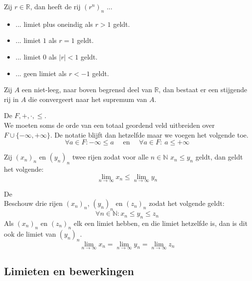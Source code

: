 \documentclass[main.tex]{subfiles}
\begin{document}
\begin{pr}
  Zij $r\in \mathbb{R}$, dan heeft de rij $(r^{n})_{n}$ ...
  \begin{itemize}
  \item ... limiet plus oneindig als $r>1$ geldt.
  \item ... limiet $1$ als $r=1$ geldt.
  \item ... limiet $0$ als $|r|<1$ geldt.
  \item ... geen limiet als $r<-1$ geldt.
  \end{itemize}
\end{pr}

\begin{pr}
  Zij $A$ een niet-leeg, naar boven begrensd deel van $\mathbb{R}$, dan bestaat er een stijgende rij in $A$ die convergeert naar het supremum van $A$.
  
\end{pr}

\begin{de}
  De  $F,+,\cdot,\le$.\\
  We moeten soms de orde van een totaal geordend veld uitbreiden over $F \cup \{ -\infty,+\infty\}$.
  De notatie blijft dan hetzelfde maar we voegen het volgende toe.
  \[ \forall a\in F: -\infty \le a \quad\text{ en }\quad \forall a \in F:\ a \le +\infty \]
\end{de}

\begin{pr}
  Zij $(x_{n})_{n}$ en $(y_{n})_{n}$ twee rijen zodat voor alle $n\in \mathbb{N}$ $x_{n}\le y_{n}$ geldt, dan geldt het volgende:
  \[ \lim_{n\rightarrow \infty}x_{n} \le \lim_{n\rightarrow \infty}y_{n} \]
\end{pr}

\begin{st}
  De \\
  Beschouw drie rijen $(x_{n})_{n}$, $(y_{n})_{n}$ en $(z_{n})_{n}$ zodat het volgende geldt:
  \[ \forall n\in \mathbb{N}: x_{n}\le y_{n}\le z_{n} \]
  Als $(x_{n})_{n}$ en $(z_{n})_{n}$ elk een limiet hebben, en die limiet hetzelfde is, dan is dit ook de limiet van $(y_{n})_{n}$.
  \[ \lim_{n\rightarrow \infty}x_{n} = \lim_{n\rightarrow \infty}y_{n} = \lim_{n\rightarrow \infty}z_{n} \]
\end{st}

\subsection{Limieten en bewerkingen}
\label{sec:limi-en-bewerk}
\end{document}
